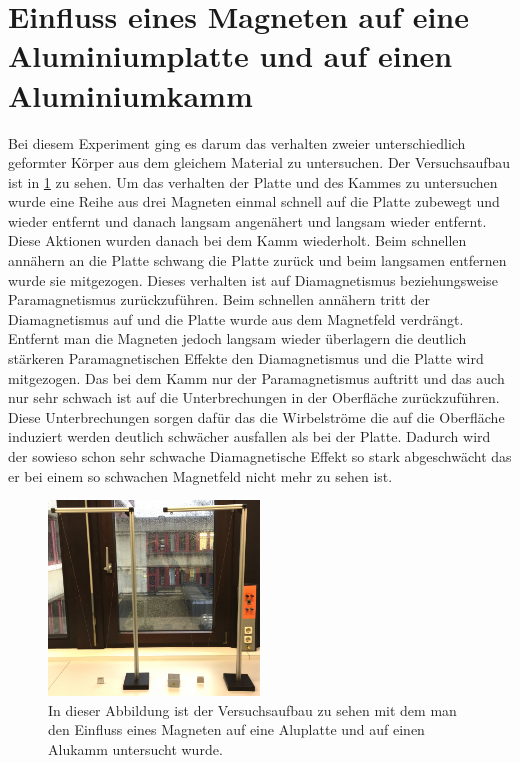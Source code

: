 \section{Einfluss eines Magneten auf eine Aluminiumplatte und auf einen Aluminiumkamm }\label{kap:Kamm_Platte}
Bei diesem Experiment ging es darum das verhalten zweier unterschiedlich geformter Körper aus dem gleichem Material zu untersuchen. Der Versuchsaufbau ist in \cref{fig:Alukamm} zu sehen.
Um das verhalten der Platte und des Kammes zu untersuchen wurde eine Reihe aus drei Magneten einmal schnell auf die Platte zubewegt und wieder entfernt und danach langsam angenähert und langsam wieder entfernt. Diese Aktionen wurden danach bei dem Kamm wiederholt.
Beim schnellen annähern an die Platte schwang die Platte zurück und beim langsamen entfernen wurde sie mitgezogen.
Dieses verhalten ist auf Diamagnetismus beziehungsweise Paramagnetismus zurückzuführen. Beim schnellen annähern tritt der Diamagnetismus auf und die Platte wurde aus dem Magnetfeld verdrängt. Entfernt man die Magneten jedoch langsam wieder überlagern die deutlich stärkeren Paramagnetischen Effekte den Diamagnetismus und die Platte wird mitgezogen.
Das bei dem Kamm nur der Paramagnetismus auftritt und das auch nur sehr schwach ist auf die Unterbrechungen in der Oberfläche zurückzuführen. Diese Unterbrechungen sorgen dafür das die Wirbelströme die auf die Oberfläche induziert werden deutlich schwächer ausfallen als bei der Platte.
Dadurch wird der sowieso schon sehr schwache Diamagnetische Effekt so stark abgeschwächt das er bei einem so schwachen Magnetfeld nicht mehr zu sehen ist.
\begin{figure}[h]
	\includegraphics[width=0.5\textwidth]{res/Alupendel.png}
	\caption{In dieser Abbildung ist der Versuchsaufbau zu sehen mit dem man den Einfluss eines Magneten auf eine Aluplatte und auf einen Alukamm untersucht wurde\protect\footnotemark.}
	\label{fig:Alukamm}
\end{figure}
